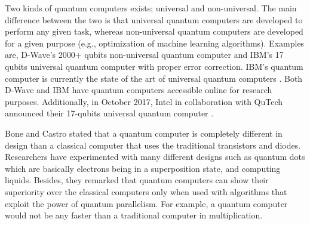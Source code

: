 \documentclass[conference, letterpaper]{IEEEtran}
\begin{document}
Two kinds of quantum computers exists; universal and non-universal. The main difference between the two is that universal quantum computers are developed to perform any given task, whereas non-universal quantum computers are developed for a given purpose (e.g., optimization of machine learning algorithms).
Examples are, D-Wave's 2000$+$ qubits non-universal quantum computer \cite{D-wave_interview} and IBM's 17 qubits universal quantum computer with proper error correction. IBM's quantum computer is currently the state of the art of universal quantum computers \cite{soeken2018programming}. Both D-Wave and IBM have quantum computers accessible online for research purposes. Additionally, in October 2017, Intel in collaboration with QuTech announced their 17-qubits universal quantum computer \cite{soeken2018programming}.

Bone and Castro \cite{Bone1997} stated that a quantum computer is completely different in design than a classical computer that uses the traditional transistors and diodes. Researchers have experimented with many different designs such as quantum dots which are basically electrons being in a superposition state, and computing liquids. Besides, they remarked that quantum computers can show their superiority over the classical computers only when used with algorithms that exploit the power of quantum parallelism. For example, a quantum computer would not be any faster than a traditional computer in multiplication. 
\end{document}
